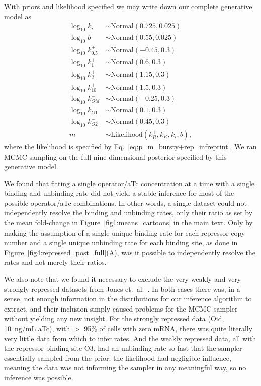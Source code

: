 With priors and likelihood specified we may write down our complete generative model as
\begin{equation}
\begin{split}
\log_{10}k_i &\sim \text{Normal}(0.725, 0.025)\\
\log_{10}b   &\sim \text{Normal}(0.55, 0.025)\\
\log_{10}k_{0.5}^+ &\sim \text{Normal}(-0.45, 0.3)\\
\log_{10}k_{1}^+   &\sim \text{Normal}(0.6, 0.3)\\
\log_{10}k_{2}^+   &\sim \text{Normal}(1.15, 0.3)\\
\log_{10}k_{10}^+  &\sim \text{Normal}(1.5, 0.3)\\
\log_{10}k_{Oid}^- &\sim \text{Normal}(-0.25, 0.3)\\
\log_{10}k_{O1}^-  &\sim \text{Normal}(0.1, 0.3)\\
\log_{10}k_{O2}^-  &\sim \text{Normal}(0.45, 0.3)\\
m &\sim \text{Likelihood}(k_R^+, k_R^-, k_i, b),
\end{split}
\end{equation}
where the likelihood is specified by Eq.~\ref{eq:p_m_bursty+rep_infreprint}.
We ran MCMC sampling on the full nine dimensional posterior specified
by this generative model.

We found that fitting a single operator/aTc concentration at a time with a
single binding and unbinding rate did not yield a stable inference for most of
the possible operator/aTc combinations. In other words, a single dataset could
not independently resolve the binding and unbinding rates, only their ratio as
set by the mean fold-change in Figure~\ref{fig1:means_cartoons} in the main
text. Only by making the assumption of a single unique binding rate for each
repressor copy number and a single unique unbinding rate for each binding site,
as done in Figure~\ref{fig4:repressed_post_full}(A), was it possible to
independently resolve the rates and not merely their ratios.

We also note that we found it necessary to exclude the very weakly and very
strongly repressed datasets from Jones et.\ al.~\cite{Jones2014}. In both cases
there was, in a sense, not enough information in the distributions for our
inference algorithm to extract, and their inclusion simply caused problems for
the MCMC sampler without yielding any new insight. For the strongly repressed
data (Oid, 10~ng/mL aTc), with $>$ 95\% of cells with zero mRNA, there was quite
literally very little data from which to infer rates. And the weakly repressed
data, all with the repressor binding site O3, had an unbinding rate so fast that
the sampler essentially sampled from the prior; the likelihood had negligible
influence, meaning the data was not informing the sampler in any meaningful way,
so no inference was possible.
